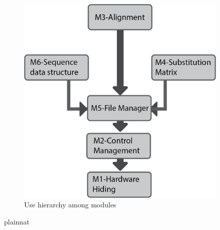 \documentclass[12pt, titlepage]{article}
\begin{document}

\begin{figure}[H]
\centering
\includegraphics[width=0.9\textwidth]{module_inter_2.png}
\caption{Use hierarchy among modules}
\label{FigUH}
\end{figure}









 {plainnat}


\newpage{}
\end{document}
